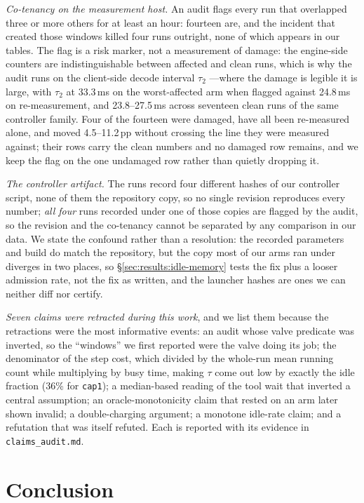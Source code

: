 \emph{Co-tenancy on the measurement host.} An audit flags every run that
overlapped three or more others for at least an hour: fourteen are, and the
incident that created those windows killed four runs outright, none of which
appears in our tables. The flag is a risk marker, not a measurement of damage: the
engine-side counters are indistinguishable between affected and clean runs, which
is why the audit runs on the client-side decode interval $\tau_2$
\cite{yun2016}---where the damage is legible it is large, with $\tau_2$ at 33.3\,ms on the worst-affected arm
when flagged against 24.8\,ms on re-measurement, and 23.8--27.5\,ms across seventeen
clean runs of the same controller family. Four of the fourteen were damaged, have
all been re-measured alone, and moved 4.5--11.2\,pp without crossing the line they
were measured against; their rows carry the clean numbers and no damaged row
remains, and we keep the flag on the one undamaged row rather than quietly
dropping it.

\emph{The controller artifact.} The runs record four different hashes of our
controller script, none of them the repository copy, so no single
revision reproduces every number; \emph{all four} runs recorded under one of those
copies are flagged by the audit, so the revision and the co-tenancy
cannot be separated by any comparison in our data. We state the confound rather
than a resolution: the recorded parameters and build do match the repository, but
the copy most of our arms ran under diverges in two places, so
\S\ref{sec:results:idle-memory} tests the fix plus a looser admission rate, not
the fix as written, and the launcher hashes are ones we can neither diff nor
certify.

\emph{Seven claims were retracted during this work}, and we list them because the
retractions were the most informative events: an audit whose valve predicate was
inverted, so the ``windows'' we first reported were the valve doing its job; the
denominator of the step cost, which divided by the whole-run mean running count
while multiplying by busy time, making $\tau$ come out low by exactly the idle
fraction (36\% for \texttt{cap1}); a median-based reading of the tool wait that
inverted a central assumption; an oracle-monotonicity claim that rested on an
arm later shown invalid; a double-charging argument; a monotone idle-rate claim;
and a refutation that was itself refuted. Each is reported with its evidence in
\texttt{claims\_audit.md}.

\section{Conclusion}

